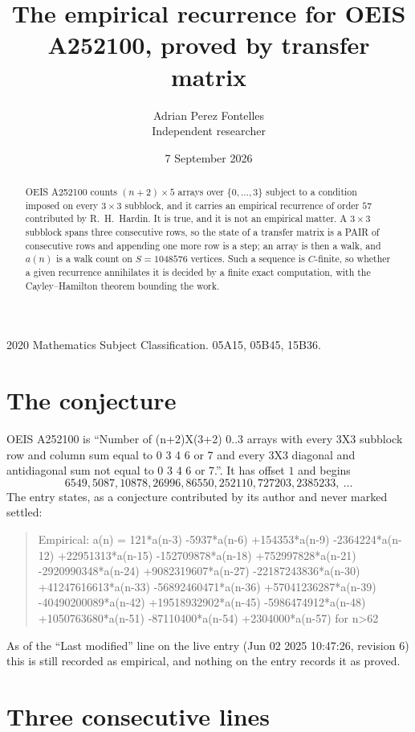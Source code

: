 \documentclass[11pt,a4paper]{article}
\title{The empirical recurrence for OEIS A252100, proved by transfer matrix}
\author{Adrian Perez Fontelles\\ \small Independent researcher}
\date{7 September 2026}
\theoremstyle{plain}
\theoremstyle{definition}
\begin{document}
\maketitle

\begin{abstract}
OEIS A252100 counts $(n+2)\times5$ arrays over $\{0,\dots,3\}$ subject to a condition imposed on
every $3\times3$ subblock, and it carries an empirical recurrence of order $57$
contributed by R.~H.~Hardin. It is true, and it is not an empirical matter. A $3\times3$
subblock spans three consecutive rows, so the state of a transfer matrix is a PAIR of
consecutive rows and appending one more row is a step; an array is then a walk, and
$a(n)$ is a walk count on $S=1048576$ vertices. Such a sequence is $C$-finite, so whether a given
recurrence annihilates it is decided by a finite exact computation, with the Cayley--Hamilton
theorem bounding the work.
\end{abstract}

\noindent\small 2020 Mathematics Subject Classification. 05A15, 05B45, 15B36.\normalsize

\section{The conjecture}

OEIS A252100 is ``Number of (n+2)X(3+2) 0..3 arrays with every 3X3 subblock row and column sum equal to 0 3 4 6 or 7 and every 3X3 diagonal and antidiagonal sum not equal to 0 3 4 6 or 7.''. It has offset $1$ and begins
\[
6549, 5087, 10878, 26996, 86550, 252110, 727203, 2385233,\ \dots
\]
The entry states, as a conjecture contributed by its author and never marked settled:
\begin{quote}
Empirical: a(n) = 121*a(n-3) -5937*a(n-6) +154353*a(n-9) -2364224*a(n-12) +22951313*a(n-15) -152709878*a(n-18) +752997828*a(n-21) -2920990348*a(n-24) +9082319607*a(n-27) -22187243836*a(n-30) +41247616613*a(n-33) -56892460471*a(n-36) +57041236287*a(n-39) -40490200089*a(n-42) +19518932902*a(n-45) -5986474912*a(n-48) +1050763680*a(n-51) -87110400*a(n-54) +2304000*a(n-57) for n>62
\end{quote}
As of the ``Last modified'' line on the live entry (Jun 02 2025 10:47:26, revision 6) this is still
recorded as empirical, and nothing on the entry records it as proved.

\section{Three consecutive lines}
\end{document}
